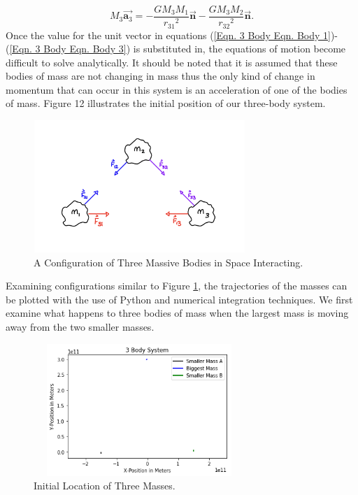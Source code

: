 \documentclass[twocolumn]{article}
\begin{document}
\begin{equation}\label{Eqn. 3 Body Eqn. Body 3}
M_3 \Vec{\textbf{a}_3}=-\frac{GM_3M_1}{{r_{31}}^2}{\Vec{\textbf{n}}}-\frac{GM_3M_2}{{r_{32}}^2}{\Vec{\textbf{n}}}.  
\end{equation}
Once the value for the unit vector in equations (\ref{Eqn. 3 Body Eqn. Body 1})-(\ref{Eqn. 3 Body Eqn. Body 3}) is substituted in, the equations of motion become difficult to solve analytically. It should be noted that it is assumed that these bodies of mass are not changing in mass thus the only kind of change in momentum that can occur in this system is an acceleration of one of the bodies of mass.
Figure 12 illustrates the initial position of our three-body system.
\begin{figure}[h]
    \centering
    \includegraphics[width=8cm, height=5cm]{Figures/3-Body Cartoon (1).png}
    \caption{\small{A Configuration of Three Massive Bodies in Space Interacting.}}
    \label{Fig. 3-Body Cartoon Fig. 1}
\end{figure}
\par \noindent
Examining configurations similar to Figure \ref{Fig. 3-Body Cartoon Fig. 1}, the trajectories of the masses can be plotted with the use of Python and numerical integration techniques. We first examine what happens to three bodies of mass when the largest mass is moving away from the two smaller masses.
\newpage
\begin{figure}[h]
    \centering
    \includegraphics[width=8cm, height=5cm]{Figures/3-Body Dynamics (1).png}
    \caption{\small{Initial Location of Three Masses.}}
    \label{Fig. 3-Body Dynamics Fig. 1}
\end{figure}
\end{document}
